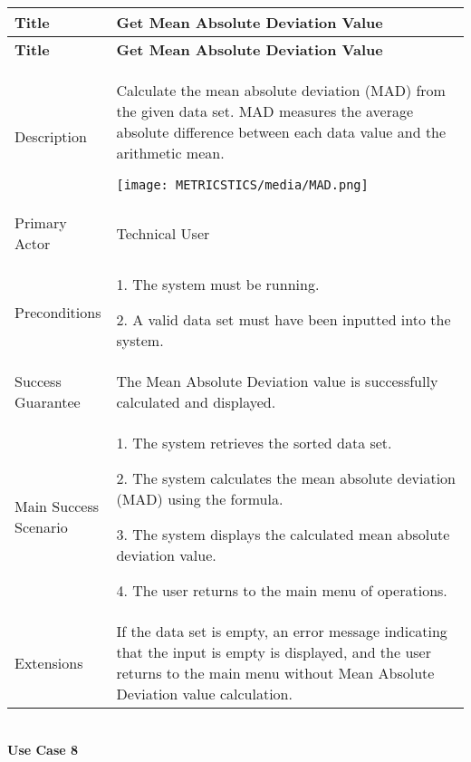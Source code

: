     \begin{longtable}{|p{0.227\linewidth}|p{0.773\linewidth}|}
    \hline
    \textbf{Title} & \textbf{Get Mean Absolute Deviation Value} \\
    \hline
    \endfirsthead
    \hline
    \textbf{Title} & \textbf{Get Mean Absolute Deviation Value} \\
    \hline
    \endhead
    \hline
    \endfoot
    \hline
    \endlastfoot
    Description & Calculate the mean absolute deviation (MAD) from the given
    data set. MAD measures the average absolute difference between each data
    value and the arithmetic mean.
    
    \texttt{[image: METRICSTICS/media/MAD.png]} \\ \hline
    Primary Actor & Technical User \\ \hline
    Preconditions & 1. The system must be running.
    
    2. A valid data set must have been inputted into the system. \\ \hline
    Success Guarantee & The Mean Absolute Deviation value is successfully
    calculated and displayed. \\ \hline
    Main Success Scenario & 1. The system retrieves the sorted data set.
    
    2. The system calculates the mean absolute deviation (MAD) using the
    formula.
    
    3. The system displays the calculated mean absolute deviation value.
    
    4. The user returns to the main menu of operations. \\ \hline
    Extensions & If the data set is empty, an error message indicating that
    the input is empty is displayed, and the user returns to the main menu
    without Mean Absolute Deviation value calculation.
    \end{longtable}
    
    \pagebreak
    
    \strut \\
    \textbf{\large Use Case 8}
    
